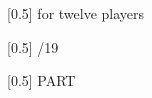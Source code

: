 \documentclass[11pt]{report}
\begin{document}
\begin{titlepage}
        \vspace*{1\baselineskip}
\begin{center}
        {
            \scalebox{0.5}[0.5]
            {\fontsize{1.3cm}{1em}\selectfont for twelve players}
        }
\end{center}
        \vspace*{0.5\baselineskip}
\begin{center}
        {
            \scalebox{0.5}[0.5]
            {\fontsize{1cm}{1em}/19}
        }
\end{center}
        \vspace*{17\baselineskip}
\begin{center}
        {
            \scalebox{0.5}[0.5]
            {\fontsize{1cm}{1em}\selectfont PART}
        }
\end{center}

    \end{titlepage}
\end{document}
